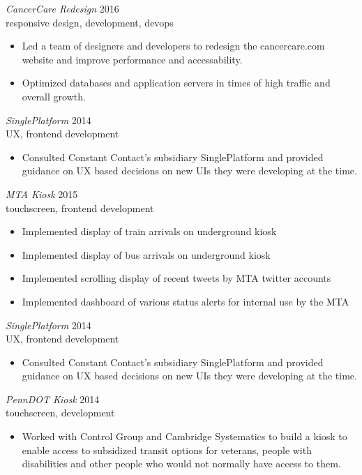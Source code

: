 \documentclass[line,margin]{res}
\begin{document}
\begin{resume}
    {\sl CancerCare Redesign}
    \hfill 2016 \\
    responsive design, development, devops
    \begin{itemize} \itemsep -2pt
        \item
            Led a team of designers and developers to redesign the cancercare.com website 
            and improve performance and accessability.
        \item
            Optimized databases and application servers in times of high traffic and overall
            growth.
    \end{itemize}

    {\sl SinglePlatform}
    \hfill 2014 \\
    UX, frontend development
    \begin{itemize} \itemsep -2pt
        \item
            Consulted Constant Contact's subsidiary SinglePlatform and provided guidance
            on UX based decisions on new UIs they were developing at the time.
    \end{itemize}

    {\sl MTA Kiosk}
    \hfill 2015 \\
    touchscreen, frontend development
    \begin{itemize} \itemsep -2pt
        \item
            Implemented display of train arrivals on underground kiosk
        \item
            Implemented display of bus arrivals on underground kiosk
        \item
            Implemented scrolling display of recent tweets by MTA twitter accounts
        \item
            Implemented dashboard of various status alerts for internal use by the MTA
    \end{itemize}

    {\sl SinglePlatform}
    \hfill 2014 \\
    UX, frontend development
    \begin{itemize} \itemsep -2pt
        \item
            Consulted Constant Contact's subsidiary SinglePlatform and provided guidance
            on UX based decisions on new UIs they were developing at the time.
    \end{itemize}

    {\sl PennDOT Kiosk}
    \hfill 2014 \\
    touchscreen, development
    \begin{itemize} \itemsep -2pt
        \item
            Worked with Control Group and Cambridge Systematics to build a kiosk to
            enable access to subsidized transit options for veterans, people with 
            disabilities and other people who would not normally have access to them.
    \end{itemize}


\end{resume}
\end{document}

